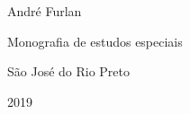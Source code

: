 \documentclass[a4paper,12pt,openright,oneside]{book}
\begin{document}
\begin{center}
\begin{figure}[H]
		\end{figure} 

		\vspace{3cm}

		\fontsize{14}{\baselineskip} \selectfont

		{André Furlan} \\  

		\vspace{4.5cm}

		\onehalfspacing

		\fontsize{14}{\baselineskip} \selectfont

		Monografia de estudos especiais \\

		\vspace{7cm}

		\fontsize{14}{\baselineskip} \selectfont  

		{São José do Rio Preto}\\ \vspace{1.0pt} 

		{2019} 

	\end{center}





	\newpage

	\thispagestyle{empty}

	\setcounter{page}{1}
\end{document}
